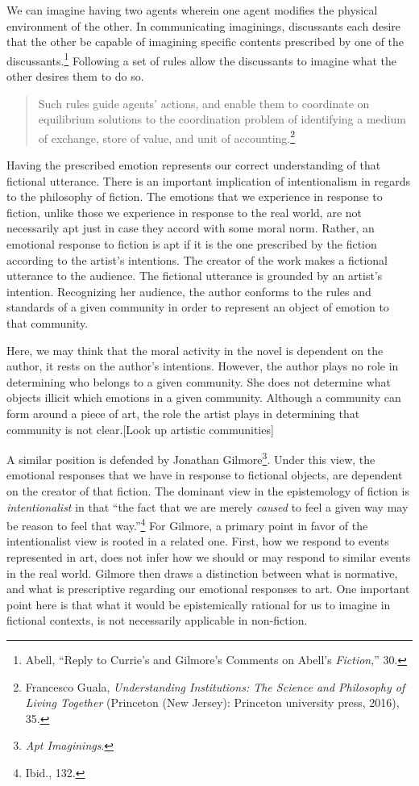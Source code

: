 \documentclass[phdthesis,12pt,final]{wuthesis}
\theoremstyle{definition}
\theoremstyle{definition}
\theoremstyle{definition}
\theoremstyle{definition}
\theoremstyle{remark}
\begin{document}
We can imagine having two agents wherein one agent modifies the physical environment of the other. In communicating imaginings, discussants each desire that the other be capable of imagining specific contents prescribed by one of the discussants.\footnote{Abell, {``Reply to {Currie}'s and {Gilmore}'s Comments on {Abell}'s {\emph{Fiction}},''} 30.} Following a set of rules allow the discussants to imagine what the other desires them to do so.

\begin{quote}
Such rules guide agents' actions, and enable them to coordinate on equilibrium solutions to the coordination problem of identifying a medium of exchange, store of value, and unit of accounting.\footnote{Francesco Guala, \emph{Understanding {Institutions}: {The Science} and {Philosophy} of {Living Together}} (Princeton (New Jersey): Princeton university press, 2016), 35.}
\end{quote}

Having the prescribed emotion represents our correct understanding of that fictional utterance. There is an important implication of intentionalism in regards to the philosophy of fiction. The emotions that we experience in response to fiction, unlike those we experience in response to the real world, are not necessarily apt just in case they accord with some moral norm. Rather, an emotional response to fiction is apt if it is the one prescribed by the fiction according to the artist's intentions. The creator of the work makes a fictional utterance to the audience. The fictional utterance is grounded by an artist's intention. Recognizing her audience, the author conforms to the rules and standards of a given community in order to represent an object of emotion to that community.

Here, we may think that the moral activity in the novel is dependent on the author, it rests on the author's intentions. However, the author plays no role in determining who belongs to a given community. She does not determine what objects illicit which emotions in a given community. Although a community can form around a piece of art, the role the artist plays in determining that community is not clear.{[}Look up artistic communities{]}

A similar position is defended by Jonathan Gilmore\footnote{\emph{Apt {Imaginings}}.}. Under this view, the emotional responses that we have in response to fictional objects, are dependent on the creator of that fiction. The dominant view in the epistemology of fiction is \emph{intentionalist} in that ``the fact that we are merely \emph{caused} to feel a given way may be reason to feel that way.''\footnote{Ibid., 132.} For Gilmore, a primary point in favor of the intentionalist view is rooted in a related one. First, how we respond to events represented in art, does not infer how we should or may respond to similar events in the real world. Gilmore then draws a distinction between what is normative, and what is prescriptive regarding our emotional responses to art. One important point here is that what it would be epistemically rational for us to imagine in fictional contexts, is not necessarily applicable in non-fiction.
\end{document}
